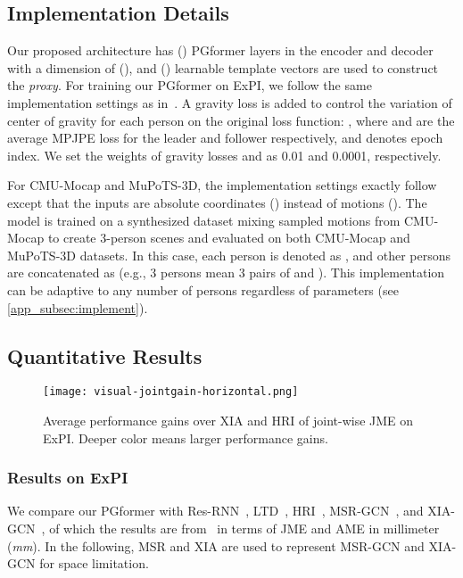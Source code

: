\documentclass[10pt,twocolumn,letterpaper]{article}
\begin{document}
\subsection{Implementation Details} 
\label{subsec:implement}
Our proposed architecture has  () PGformer layers in the encoder and decoder with a dimension of  (), and  () learnable template vectors are used to construct the \textit{proxy}. 
For training our PGformer on ExPI, we follow the same implementation settings as in~\cite{guo2021multi}. 
A gravity loss is added to control the variation of center of gravity for each person on the original loss function: , where  and  are the average MPJPE loss for the leader and follower respectively,  and  denotes epoch index. 
We set the weights of gravity losses  and  as 0.01 and 0.0001, respectively. 


For CMU-Mocap and MuPoTS-3D, the implementation settings exactly follow~\cite{wang2021multiperson} except that the inputs are absolute coordinates () instead of motions (). 
The model is trained on a synthesized dataset mixing sampled motions from CMU-Mocap to create 3-person scenes and evaluated on both CMU-Mocap and MuPoTS-3D datasets. 
In this case, each person is denoted as , and other persons are concatenated as  (e.g., 3 persons mean 3 pairs of  and ). 
This implementation can be adaptive to any number of persons regardless of parameters (see \cref{app_subsec:implement}). 



\subsection{Quantitative Results}

\begin{figure}[t]
	\begin{center}
		\centerline{\texttt{[image: visual-jointgain-horizontal.png]}} \caption{Average performance gains over XIA and HRI of joint-wise JME on ExPI. Deeper color means larger performance gains.}
		\label{fig:jointgain}
	\end{center}
  \vskip -0.4in
\end{figure}

\subsubsection{Results on ExPI}
We compare our PGformer with Res-RNN~\cite{julieta2017motion}, LTD~\cite{mao2019learning}, HRI~\cite{mao2020history}, MSR-GCN~\cite{dang2021msr}, and XIA-GCN~\cite{guo2021multi}, 
of which the results are from~\cite{guo2021multi} in terms of JME and AME in millimeter (\textit{mm}). 
In the following, MSR and XIA are used to represent MSR-GCN and XIA-GCN for space limitation. 
\end{document}
